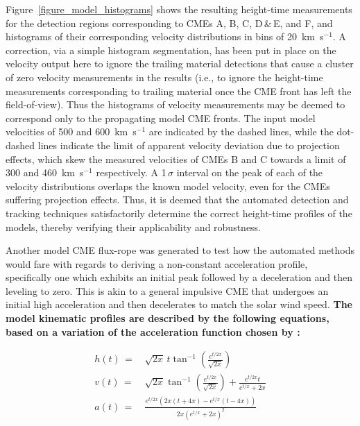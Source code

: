 \documentclass[preprint2]{aastex}
\begin{document}
Figure~\ref{figure_model_histograms} shows the resulting height-time measurements for the detection regions corresponding to CMEs A, B, C, D\,\&\,E, and F, and histograms of their corresponding velocity distributions in bins of 20~km~s$^{-1}$. A correction, via a simple histogram segmentation, has been put in place on the velocity output here to ignore the trailing material detections that cause a cluster of zero velocity measurements in the results (i.e., to ignore the height-time measurements corresponding to trailing material once the CME front has left the field-of-view). Thus the histograms of velocity measurements may be deemed to correspond only to the propagating model CME fronts. The input model velocities of 500 and 600~km~s$^{-1}$ are indicated by the dashed lines, while the dot-dashed lines indicate the limit of apparent velocity deviation due to projection effects, which skew the measured velocities of CMEs B and C towards a limit of 300 and 460~km~s$^{-1}$ respectively. A 1\,$\sigma$ interval on the peak of each of the velocity distributions overlaps the known model velocity, even for the CMEs suffering projection effects. Thus, it is deemed that the automated detection and tracking techniques satisfactorily determine the correct height-time profiles of the models, thereby verifying their applicability and robustness.

Another model CME flux-rope was generated to test how the automated methods would fare with regards to deriving a non-constant acceleration profile, specifically one which exhibits an initial peak followed by a deceleration and then leveling to zero. This is akin to a general impulsive CME that undergoes an initial high acceleration and then decelerates to match the solar wind speed. {\bf The model kinematic profiles are described by the following equations, based on a variation of the acceleration function chosen by \citet{2003ApJ...588L..53G}:}

\begin{eqnarray}
h(t)\,=&\,\sqrt{2x}\,t\tan^{-1}\left(\frac{e^{t/2x}}{\sqrt{2x}}\right) \\
v(t)\,=&\,\sqrt{2x}\tan^{-1}\left(\frac{e^{t/2x}}{\sqrt{2x}}\right)+\frac{e^{t/2x}t}{e^{t/x}+2x} \\
a(t)\,=&\,\frac{e^{t/2x}\left(2x\left(t+4x\right)-e^{t/x}\left(t-4x\right)\right)}{2x\left(e^{t/x}+2x\right)^2}
\end{eqnarray}
\end{document}
